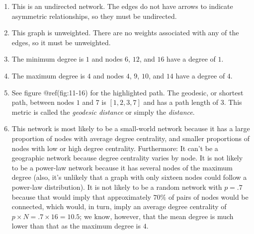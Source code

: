 \documentclass{book}
\begin{document}
\begin{enumerate}
  \begin{enumerate}
  \def\labelenumii{\arabic{enumii}.}
  \item
    This is an undirected network. The edges do not have arrows to indicate
    asymmetric relationships, so they must be undirected.
  \item
    This graph is unweighted. There are no weights associated with any of the
    edges, so it must be unweighted.
  \item
    The minimum degree is \(1\) and nodes \(6\), \(12\), and \(16\) have a
    degree of \(1\).
  \item
    The maximum degree is \(4\) and nodes \(4\), \(9\), \(10\), and \(14\)
    have a degree of \(4\).
  \item
    See figure @ref(fig:11-16) for the highlighted path. The geodesic, or
    shortest path, between nodes \(1\) and \(7\) is \([1, 2, 3, 7]\) and has a
    path length of \(3\). This metric is called the \emph{geodesic distance}
    or simply the \emph{distance}.
  \item
    This network is most likely to be a small-world network because it has a
    large proportion of nodes with average degree centrality, and smaller
    proportions of nodes with low or high degree centrality. Furthermore: It
    can't be a geographic network because degree centrality varies by node. It
    is not likely to be a power-law network because it has several nodes of
    the maximum degree (also, it's unlikely that a graph with only sixteen
    nodes could follow a power-law distribution). It is not likely to be a
    random network with \(p = .7\) because that would imply that approximately
    \(70\%\) of pairs of nodes would be connected, which would, in turn, imply
    an average degree centrality of \(p \times N = .7 \times 16 = 10.5\); we
    know, however, that the mean degree is much lower than that as the maximum
    degree is \(4\).
  \end{enumerate}
\end{enumerate}
\end{document}
